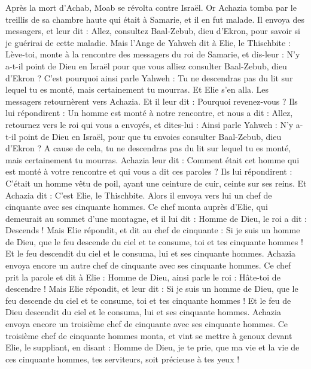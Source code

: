 \begin{multicols}{2}
\VerseOne{}Après la mort d’Achab, Moab se révolta contre Israël.
Or Achazia tomba par le treillis de sa chambre haute qui était à Samarie, et il en fut malade. Il envoya des messagers, et leur dit : Allez, consultez Baal-Zebub, dieu d’Ekron, pour savoir si je guérirai de cette maladie.
Mais l’Ange de Yahweh dit à Elie, le Thischbite : Lève-toi, monte à la rencontre des messagers du roi de Samarie, et dis-leur : N’y a-t-il point de Dieu en Israël pour que vous alliez consulter Baal-Zebub, dieu d’Ekron ?
C’est pourquoi ainsi parle Yahweh : Tu ne descendras pas du lit sur lequel tu es monté, mais certainement tu mourras. Et Elie s’en alla.
Les messagers retournèrent vers Achazia. Et il leur dit : Pourquoi revenez-vous ?
Ils lui répondirent : Un homme est monté à notre rencontre, et nous a dit : Allez, retournez vers le roi qui vous a envoyés, et dites-lui : Ainsi parle Yahweh : N’y a-t-il point de Dieu en Israël, pour que tu envoies consulter Baal-Zebub, dieu d’Ekron ? A cause de cela, tu ne descendras pas du lit sur lequel tu es monté, mais certainement tu mourras.
Achazia leur dit : Comment était cet homme qui est monté à votre rencontre et qui vous a dit ces paroles ?
Ils lui répondirent : C’était un homme vêtu de poil, ayant une ceinture de cuir, ceinte sur ses reins. Et Achazia dit : C’est Elie, le Thischbite.
Alors il envoya vers lui un chef de cinquante avec ses cinquante hommes. Ce chef monta auprès d’Elie, qui demeurait au sommet d’une montagne, et il lui dit : Homme de Dieu, le roi a dit : Descends !
Mais Elie répondit, et dit au chef de cinquante : Si je suis un homme de Dieu, que le feu descende du ciel et te consume, toi et tes cinquante hommes ! Et le feu descendit du ciel et le consuma, lui et ses cinquante hommes.
Achazia envoya encore un autre chef de cinquante avec ses cinquante hommes. Ce chef prit la parole et dit à Elie : Homme de Dieu, ainsi parle le roi : Hâte-toi de descendre !
Mais Elie répondit, et leur dit : Si je suis un homme de Dieu, que le feu descende du ciel et te consume, toi et tes cinquante hommes ! Et le feu de Dieu descendit du ciel et le consuma, lui et ses cinquante hommes.
Achazia envoya encore un troisième chef de cinquante avec ses cinquante hommes. Ce troisième chef de cinquante hommes monta, et vint se mettre à genoux devant Elie, le suppliant, en disant : Homme de Dieu, je te prie, que ma vie et la vie de ces cinquante hommes, tes serviteurs, soit précieuse à tes yeux !

\end{multicols}
